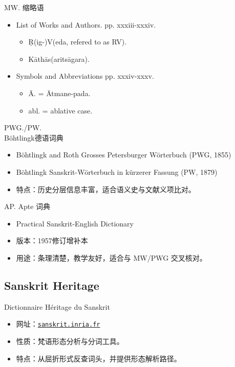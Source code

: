 \documentclass[17pt]{beamer}
\newcommand{\dicturl}[2]{\href{#1}{\mbox{\texttt{#2}}}}
\begin{document}
\begin{frame}{MW. 缩略语}
  \small
  \begin{itemize}
    \item List of Works and Authors. pp. xxxiii-xxxiv.\\
    \begin{itemize}
      \item Ṛ(ig-)V(eda, refered to as RV).
      \item Kāthās(aritsāgara).
    \end{itemize}
    \item Symbols and Abbreviations pp. xxxiv-xxxv.\\
    \begin{itemize}
      \item Ā. = Ātmane-pada.
      \item abl. = ablative case.
    \end{itemize}    
  \end{itemize}
\end{frame}

\begin{frame}{PWG./PW. \\Böhtlingk德语词典}
  \small
  \begin{itemize}
    \item Böhtlingk and Roth Grosses Petersburger Wörterbuch (PWG, 1855)
    \item Böhtlingk Sanskrit-Wörterbuch in kürzerer Fassung (PW, 1879)
    \item 特点：历史分层信息丰富，适合语义史与文献义项比对。
  \end{itemize}
\end{frame}

\begin{frame}{AP. Apte 词典}
  \small
  \begin{itemize}
    \item Practical Sanskrit-English Dictionary
    \item 版本：1957修订增补本
    \item 用途：条理清楚，教学友好，适合与 MW/PWG 交叉核对。
  \end{itemize}
\end{frame}

\subsection{Sanskrit Heritage}
\begin{frame}{Dictionnaire Héritage du Sanskrit}
  \small
  \begin{itemize}
    \item 网址：\dicturl{https://sanskrit.inria.fr/}{sanskrit.inria.fr}
    \item 性质：梵语形态分析与分词工具。
    \item 特点：从屈折形式反查词头，并提供形态解析路径。
  \end{itemize}
\end{frame}
\end{document}
